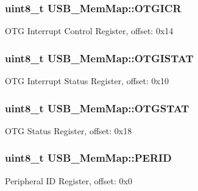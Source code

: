 \subsubsection[{O\+T\+G\+I\+C\+R}]{\setlength{\rightskip}{0pt plus 5cm}uint8\+\_\+t U\+S\+B\+\_\+\+Mem\+Map\+::\+O\+T\+G\+I\+C\+R}\label{struct_u_s_b___mem_map_a4cd829d73e01b3cf0a4fa9affedb210f}
O\+T\+G Interrupt Control Register, offset\+: 0x14 \hypertarget{struct_u_s_b___mem_map_a6eacb73f23f815f7686f4e7bf7eb2fcc}{}
\subsubsection[{O\+T\+G\+I\+S\+T\+A\+T}]{\setlength{\rightskip}{0pt plus 5cm}uint8\+\_\+t U\+S\+B\+\_\+\+Mem\+Map\+::\+O\+T\+G\+I\+S\+T\+A\+T}\label{struct_u_s_b___mem_map_a6eacb73f23f815f7686f4e7bf7eb2fcc}
O\+T\+G Interrupt Status Register, offset\+: 0x10 \hypertarget{struct_u_s_b___mem_map_a0398fe890efd8110f3d182e7fcb8a0c5}{}
\subsubsection[{O\+T\+G\+S\+T\+A\+T}]{\setlength{\rightskip}{0pt plus 5cm}uint8\+\_\+t U\+S\+B\+\_\+\+Mem\+Map\+::\+O\+T\+G\+S\+T\+A\+T}\label{struct_u_s_b___mem_map_a0398fe890efd8110f3d182e7fcb8a0c5}
O\+T\+G Status Register, offset\+: 0x18 \hypertarget{struct_u_s_b___mem_map_aa3644755d5a3d7b9a8c01055452ebe39}{}
\subsubsection[{P\+E\+R\+I\+D}]{\setlength{\rightskip}{0pt plus 5cm}uint8\+\_\+t U\+S\+B\+\_\+\+Mem\+Map\+::\+P\+E\+R\+I\+D}\label{struct_u_s_b___mem_map_aa3644755d5a3d7b9a8c01055452ebe39}
Peripheral I\+D Register, offset\+: 0x0 \hypertarget{struct_u_s_b___mem_map_ac918187248616aac7e5223124ea9610d}{}
